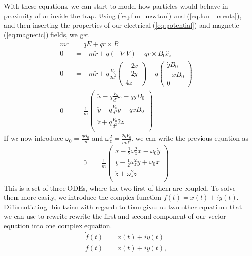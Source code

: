With these equations, we can start to model how particles would behave in proximity of or inside the trap. Using (\ref{eq:fun_newton}) and (\ref{eq:fun_lorentz}), and then inserting the properties of our electrical (\ref{eq:potential}) and magnetic (\ref{eq:magnetic}) fields, we get
%
\begin{align*}
m \ddot r &= qE + q\dot r \times B \\
0 &= - m \ddot r + q(- \nabla V) + q\dot r \times B_0 \hat{e}_z \\
0 &= - m \ddot r + q \frac{V_0}{2d^2} \begin{pmatrix} -2x \\ -2y \\ 4z \end{pmatrix}
          + q \begin{pmatrix} \dot y B_0 \\ -\dot x B_0 \\ 0 \end{pmatrix} \\
0 &= \frac{1}{m}
    \begin{pmatrix} 
        \ddot x - q \frac{V_0}{d^2} x - q \dot y B_0 \\
        \ddot y - q \frac{V_0}{d^2} y + q \dot x B_0 \\
        \ddot z + q \frac{V_0}{d^2} 2z \\
    \end{pmatrix}
\end{align*}
%
If we now introduce $\omega_0 = \frac{q B_0}{m}$ and $\omega_z^2 = \frac{2qV_0}{md^2}$, we can write the previous equation as
%
\begin{align*}
0 &= \frac{1}{m}
    \begin{pmatrix} 
        \ddot x - \frac{1}{2} \omega_z^2 x - \omega_0 \dot y \\
        \ddot y - \frac{1}{2} \omega_z^2 y + \omega_0 \dot x \\
        \ddot z + \omega_z^2 z \\
    \end{pmatrix}
\end{align*}
%
This is a set of three ODEs, where the two first of them are coupled. To solve them more easily, we introduce the complex function $f(t) = x(t) + i y(t)$. Differentiating this twice with regards to time gives us two other equations that we can use to rewrite rewrite the first and second component of our vector equation into one complex equation.
%
\begin{align}
\dot f(t) &= \dot x(t) + i \dot y(t) \\
\ddot f(t) &= \ddot x(t) + i \ddot y(t),
\end{align}
